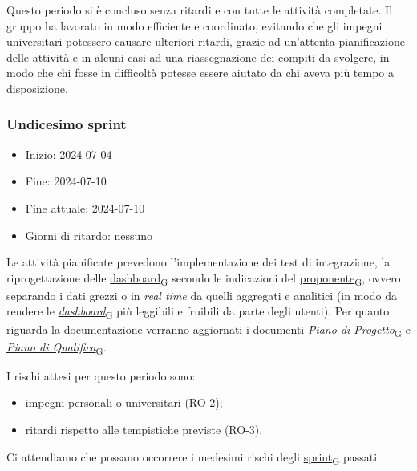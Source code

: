 Questo periodo si è concluso senza ritardi e con tutte le attività completate. Il gruppo ha lavorato in modo efficiente e coordinato, evitando che gli impegni universitari potessero causare ulteriori ritardi, grazie ad un'attenta pianificazione delle attività e in alcuni casi ad una riassegnazione dei compiti da svolgere, in modo che chi fosse in difficoltà potesse essere aiutato da chi aveva più tempo a disposizione.


\newpage
\subsubsection{Undicesimo sprint}
\begin{itemize}
    \item Inizio: 2024-07-04
    \item Fine: 2024-07-10
    \item Fine attuale: 2024-07-10
    \item Giorni di ritardo: nessuno
\end{itemize}

Le attività pianificate prevedono l'implementazione dei test di integrazione, la riprogettazione delle \href{https://7last.github.io/docs/pb/documentazione-interna/glossario\#dashboard}{dashboard\textsubscript{G}} secondo le indicazioni del \href{https://7last.github.io/docs/pb/documentazione-interna/glossario\#proponente}{proponente\textsubscript{G}}, ovvero separando i dati grezzi o in \textit{real time} da quelli aggregati e analitici (in modo da rendere le \href{https://7last.github.io/docs/pb/documentazione-interna/glossario\#dashboard}{\textit{dashboard}\textsubscript{G}} più leggibili e fruibili da parte degli utenti). Per quanto riguarda la documentazione verranno aggiornati i documenti \href{https://7last.github.io/docs/pb/documentazione-interna/glossario\#piano-di-progetto}{\textit{Piano di Progetto}\textsubscript{G}} e \href{https://7last.github.io/docs/pb/documentazione-interna/glossario\#piano-di-qualifica}{\textit{Piano di Qualifica}\textsubscript{G}}.

I rischi attesi per questo periodo sono:
\begin{itemize}
    \item impegni personali o universitari (RO-2);
	\item ritardi rispetto alle tempistiche previste (RO-3).
\end{itemize}
Ci attendiamo che possano occorrere i medesimi rischi degli \href{https://7last.github.io/docs/pb/documentazione-interna/glossario\#sprint}{sprint\textsubscript{G}} passati.

